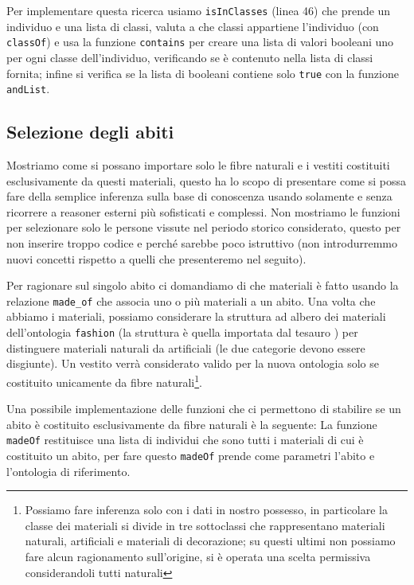 Per implementare questa ricerca usiamo \verb|isInClasses| (linea 46) che prende un individuo e una lista di classi, valuta a che classi appartiene l'individuo (con \verb|classOf|) e usa la funzione \verb|contains| per creare una lista di valori booleani uno per ogni classe dell'individuo, verificando se è contenuto nella lista di classi fornita; infine si verifica se la lista di booleani contiene solo \verb|true| con la funzione \verb|andList|.

\subsection{Selezione degli abiti}
Mostriamo come si possano importare solo le fibre naturali e i vestiti costituiti esclusivamente da questi materiali, questo ha lo scopo di presentare come si possa fare della semplice inferenza sulla base di conoscenza usando solamente \cduce e senza ricorrere a reasoner esterni più sofisticati e complessi. Non mostriamo le funzioni per selezionare solo le persone vissute nel periodo storico considerato, questo per non inserire troppo codice e perché sarebbe poco istruttivo (non introdurremmo nuovi concetti rispetto a quelli che presenteremo nel seguito).

Per ragionare sul singolo abito ci domandiamo di che materiali è fatto usando la relazione \verb|made_of| che associa uno o più materiali a un abito. Una volta che abbiamo i materiali, possiamo considerare la struttura ad albero dei materiali dell'ontologia \verb|fashion| (la struttura è quella importata dal tesauro ) per distinguere materiali naturali da artificiali (le due categorie devono essere disgiunte). Un vestito verrà considerato valido per la nuova ontologia solo se costituito unicamente da fibre naturali\footnote{Possiamo fare inferenza solo con i dati in nostro possesso, in particolare la classe dei materiali si divide in tre sottoclassi che rappresentano materiali naturali, artificiali e materiali di decorazione; su questi ultimi non possiamo fare alcun ragionamento sull'origine, si è operata una scelta permissiva considerandoli tutti naturali}.

Una possibile implementazione delle funzioni che ci permettono di stabilire se un abito è costituito esclusivamente da fibre naturali è la seguente:
La funzione \verb|madeOf| restituisce una lista di individui che sono tutti i materiali di cui è costituito un abito, per fare questo \verb|madeOf| prende come parametri l'abito e l'ontologia di riferimento. 

